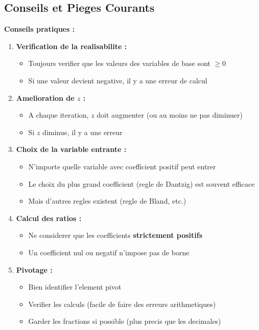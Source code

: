 \documentclass[12pt,a4paper]{article}
\begin{document}
\newpage
\subsection{Conseils et Pieges Courants}

\begin{astuce}
\textbf{Conseils pratiques :}

\begin{enumerate}
    \item \textbf{Verification de la realisabilite :}
    \begin{itemize}
        \item Toujours verifier que les valeurs des variables de base sont $\geq 0$
        \item Si une valeur devient negative, il y a une erreur de calcul
    \end{itemize}
    
    \item \textbf{Amelioration de $z$ :}
    \begin{itemize}
        \item A chaque iteration, $z$ doit augmenter (ou au moins ne pas diminuer)
        \item Si $z$ diminue, il y a une erreur
    \end{itemize}
    
    \item \textbf{Choix de la variable entrante :}
    \begin{itemize}
        \item N'importe quelle variable avec coefficient positif peut entrer
        \item Le choix du plus grand coefficient (regle de Dantzig) est souvent efficace
        \item Mais d'autres regles existent (regle de Bland, etc.)
    \end{itemize}
    
    \item \textbf{Calcul des ratios :}
    \begin{itemize}
        \item Ne considerer que les coefficients \textcolor{importantrouge}{\textbf{strictement positifs}}
        \item Un coefficient nul ou negatif n'impose pas de borne
    \end{itemize}
    
    \item \textbf{Pivotage :}
    \begin{itemize}
        \item Bien identifier l'element pivot
        \item Verifier les calculs (facile de faire des erreurs arithmetiques)
        \item Garder les fractions si possible (plus precis que les decimales)
    \end{itemize}
\end{enumerate}
\end{astuce}
\end{document}
